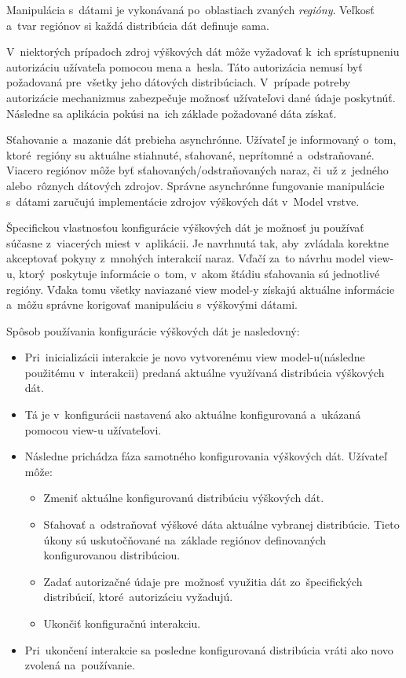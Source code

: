 Manipulácia s~dátami je vykonávaná po~oblastiach zvaných \textit{regióny}. Veľkosť a~tvar regiónov si každá distribúcia dát definuje sama. 

V~niektorých prípadoch zdroj výškových dát môže vyžadovať k~ich sprístupneniu autorizáciu užívateľa pomocou mena a~hesla. Táto autorizácia nemusí byť požadovaná pre~všetky jeho dátových distribúciach. V~prípade potreby autorizácie mechanizmus zabezpečuje možnosť užívateľovi dané údaje poskytnúť. Následne sa aplikácia pokúsi na~ich základe požadované dáta získať.   

Sťahovanie a~mazanie dát prebieha asynchrónne. Užívateľ je informovaný o~tom, ktoré~regióny su aktuálne stiahnuté, sťahované, neprítomné a~odstraňované. Viacero regiónov môže byť sťahovaných/odstraňovaných naraz, či~už z~jedného alebo~rôznych dátových zdrojov. Správne asynchrónne fungovanie manipulácie s~dátami zaručujú implementácie zdrojov výškových dát v~Model vrstve.

Špecifickou vlastnosťou konfigurácie výškových dát je možnosť ju používať súčasne z~viacerých miest v~aplikácii. Je navrhnutá tak, aby~zvládala korektne akceptovať pokyny z~mnohých interakcií naraz. Vďačí za~to návrhu model view-u, ktorý~poskytuje informácie o~tom, v~akom štádiu sťahovania sú jednotlivé regióny. Vďaka tomu všetky naviazané view model-y získajú aktuálne informácie a~môžu správne korigovať manipuláciu s~výškovými dátami.

Spôsob používania konfigurácie výškových dát je nasledovný:
\begin{itemize}
    \item Pri~inicializácii interakcie je novo vytvorenému view model-u(následne použitému v~interakcii) predaná aktuálne využívaná distribúcia výškových dát.
    \item Tá je v~konfigurácii nastavená ako aktuálne konfigurovaná a~ukázaná pomocou view-u užívateľovi.
    \item Následne prichádza fáza samotného konfigurovania výškových dát. Užívateľ môže:
    \begin{itemize}
        \item Zmeniť aktuálne konfigurovanú distribúciu výškových dát.
        \item Sťahovať a~odstraňovať výškové dáta aktuálne vybranej distribúcie. Tieto úkony sú uskutočňované na~základe regiónov definovaných konfigurovanou distribúciou.
        \item Zadať autorizačné údaje pre~možnosť využitia dát zo~špecifických distribúcií, ktoré~autorizáciu vyžadujú. 
        \item Ukončiť konfiguračnú interakciu.
    \end{itemize} 
    \item Pri~ukončení interakcie sa posledne konfigurovaná distribúcia vráti ako novo zvolená na~používanie.
\end{itemize}

